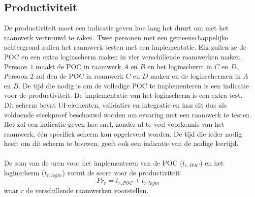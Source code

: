 \subsection{Productiviteit}
\label{sec:vergelijking-productiviteit}
De productiviteit moet een indicatie geven hoe lang het duurt om met het raamwerk vertrouwd te raken. 
Twee personen met een gemeenschappelijke achtergrond zullen het raamwerk testen met een implementatie.
Elk zullen ze de POC en een extra loginscherm maken in vier verschillende raamwerken maken.
Persoon $1$ maakt de POC in raamwerk $A$ en $B$ en het loginscherm in $C$ en $D$.
Persoon $2$ zal den de POC in raamwerk $C$ en $D$ maken en de loginschermen in $A$ en $B$.
De tijd die nodig is om de volledige POC te implementeren is een indicatie voor de productiviteit. 
De implementatie van het loginscherm is een extra test.
Dit scherm bevat UI-elementen, validaties en  integratie en kan dit dus als voldoende steekproef beschouwd worden om ervaring met een raamwerk te testen.
Het zal een indicatie geven hoe snel,  zonder al te veel voorkennis van het raamwerk,  één specifiek scherm kan opgeleverd worden.
De tijd die ieder nodig heeft om dit scherm te bouwen, geeft ook een indicatie van de nodige leertijd.
\paragraph{}
De som van de uren voor het implementeren van de POC ($t_{r,POC}$) en het loginscherm ($t_{r,login}$) vormt de score voor de productiviteit:
\begin{equation}
  Pr_r = {t_{r,POC} + t_{r,login}}
  \label{eq:productiviteit}
\end{equation}
waar $r$ de verschillende raamwerken voorstellen.

